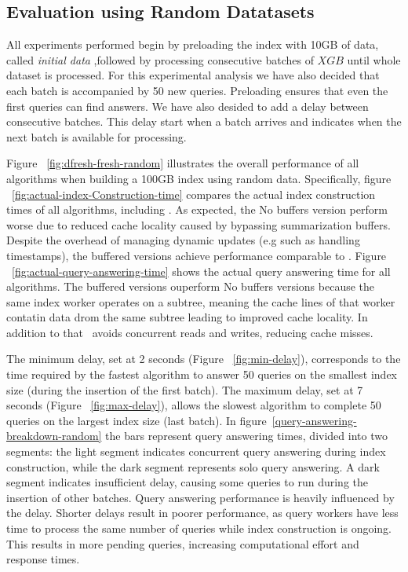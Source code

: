 \subsection{Evaluation using Random Datatasets}
All experiments performed begin by preloading the index with 10GB of data, called
\textit{initial data} ,followed by processing consecutive batches of $XGB$ until 
whole dataset is processed. For this experimental analysis we have also decided
that each batch is accompanied by 50 new queries. Preloading ensures that even the first 
queries can find answers. We have also desided to add a delay between consecutive batches.
This delay start when a batch arrives and indicates when the next batch is available for
processing.

Figure ~\ref{fig:dfresh-fresh-random} illustrates the overall performance of all 
algorithms when building a 100GB index using random data. Specifically,
figure ~\ref{fig:actual-index-Construction-time} compares the actual index construction times 
of all algorithms, including \Fresh. As expected, the No buffers version 
perform worse due to reduced cache locality caused by bypassing summarization buffers.
Despite the overhead of managing dynamic updates (e.g such as handling timestamps), 
the buffered versions achieve performance comparable to \Fresh. 
Figure ~\ref{fig:actual-query-answering-time} shows the 
actual query answering time for all algorithms. The buffered versions ouperform No buffers versions 
because the same index worker operates on a subtree, meaning the cache lines of that worker 
contatin data drom the same subtree leading to improved cache locality. In addition to that
\Fresh\ avoids concurrent reads and writes, reducing cache misses.



The minimum delay, set at 2 seconds (Figure ~\ref{fig:min-delay}), corresponds to the 
time required by the fastest algorithm to answer 50 queries on the smallest index size 
(during the insertion of the first batch). The maximum delay, set at 7 seconds
(Figure ~\ref{fig:max-delay}), allows the slowest algorithm to complete 50 queries on the
largest index size (last batch). In figure~\ref{query-answering-breakdown-random} the bars represent query answering times,
divided into two segments: the light segment indicates concurrent query answering
during index construction, while the dark segment represents solo query answering.
A dark segment indicates insufficient delay, causing some queries to run during
the insertion of other batches.
%
Query answering performance is heavily influenced by the delay. Shorter delays result
in poorer performance, as query workers have less time to process the same number
of queries while index construction is ongoing. This results in more pending queries,
increasing computational effort and response times.



